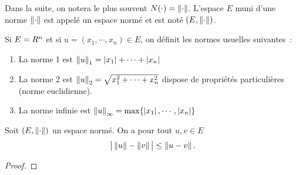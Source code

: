         Dans la suite, on notera le plus souvent $N(\cdot) = \left\lVert\cdot\right\rVert$. L'espace $E$ muni d'une norme $\left\lVert\cdot\right\rVert$ est appelé un espace normé et est noté $(E,\left\lVert\cdot\right\rVert)$.


        \sld{\vfill\pagebreak[5]}%
        \begin{exemple}
            Si $E = R^n$ et si $u = (x_1,\cdots,x_n)\in E$, on définit les normes usuelles suivantes~:
            \begin{enumerate}
                \item La norme 1 est $\left\lVert u\right\rVert_1 = \left\lvert x_1\right\rvert + \cdots + \left\lvert x_n\right\rvert $
                    \pl{\rep{4cm} }
                \item La norme 2 est $\left\lVert u\right\rVert_2 = \sqrt{x_1^2 + \cdots + x_n^2}$ dispose de propriétés particulières (norme euclidienne).
                \item La norme infinie est $\left\lVert u\right\rVert_\infty = \max\{\left\lvert x_1\right\rvert,\cdots, \left\lvert x_n\right\rvert \} $
                    \pl{\rep{4cm} }
            \end{enumerate}
        \end{exemple}

        \begin{proposition}
            Soit $(E,\left\lVert\cdot\right\rVert)$ un espace normé. On a pour tout $u,v\in E$
            \[
                \big\lvert\left\lVert u\right\rVert- \left\lVert v\right\rVert\big\rvert \leq \left\lVert u -v\right\rVert.
            \]
        \end{proposition}

        \begin{proof}\sld{
            }
            \pl{\rep{6cm} }
        \end{proof}


